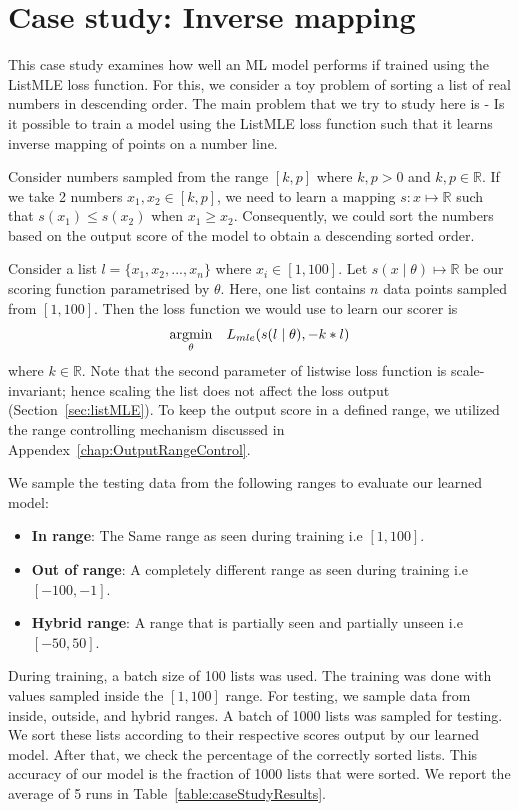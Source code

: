 \documentclass[12pt, twoside, ngerman]{report}
\begin{document}
\chapter{Case study: Inverse mapping}
\label{chap:caseStudy}

This case study examines how well an ML model performs if trained using the ListMLE loss function. For this, we consider a toy problem of sorting a list of real numbers in descending order. The main problem that we try to study here is - Is it possible to train a model using the ListMLE loss function such that it learns inverse mapping of points on a number line.

Consider numbers sampled from the range $[k,  p]$ where $k,p > 0$ and  $k,p \in \mathbb{R}$.
If we take 2 numbers $x_1, x_2 \in [k,  p]$,  we need to learn a mapping $s: x \mapsto \mathbb{R}$ such that $s(x_1) \leq s(x_2)$ when $x_1 \geq x_2$.
Consequently, we could sort the numbers based on the output score of the model to obtain a descending sorted order.

Consider a list $l = \{x_1, x_2, ..., x_n\}$ where $x_i \in [1, 100]$.
Let $s(x \mid \theta) \mapsto \mathbb{R}$ be our scoring function parametrised by $\theta$.
Here, one list contains $n$ data points sampled from $[1, 100]$.
Then the loss function we would use to learn our scorer is
\begin{equation}
\underset{\theta}{\rm argmin} \quad L_{mle}(s(l \mid \theta),  - k * l)
\end{equation}
where $k \in \mathbb{R}$.
Note that the second parameter of listwise loss function is scale-invariant; hence scaling the list does not affect the loss output (Section~\ref{sec:listMLE}).
To keep the output score in a defined range, we utilized the range controlling mechanism discussed in Appendex~\ref{chap:OutputRangeControl}.

We sample the testing data from the following ranges to evaluate our learned model:
\begin{itemize}
\item \textbf{In range}: The Same range as seen during training i.e $[1, 100]$.
\item \textbf{Out of range}: A completely different range as seen during training i.e $[-100, -1]$.
\item \textbf{Hybrid range}: A range that is partially seen and partially unseen i.e $[-50, 50]$.
\end{itemize} 
 
During training, a batch size of 100 lists was used. The training was done with values sampled inside the $[1, 100]$ range.
For testing, we sample data from inside, outside, and hybrid ranges.
A batch of 1000 lists was sampled for testing.
We sort these lists according to their respective scores output by our learned model.
After that, we check the percentage of the correctly sorted lists.
This accuracy of our model is the fraction of 1000 lists that were sorted.
We report the average of 5 runs in Table~\ref{table:caseStudyResults}.
\end{document}
